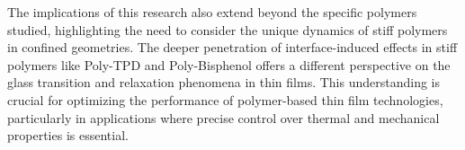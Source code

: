 The implications of this research also extend beyond the specific polymers studied, highlighting the need to consider the unique dynamics of stiff polymers in confined geometries. The deeper penetration of interface-induced effects in stiff polymers like Poly-TPD and Poly-Bisphenol offers a different perspective on the glass transition and relaxation phenomena in thin films. This understanding is crucial for optimizing the performance of polymer-based thin film technologies, particularly in applications where precise control over thermal and mechanical properties is essential.




\noindent
